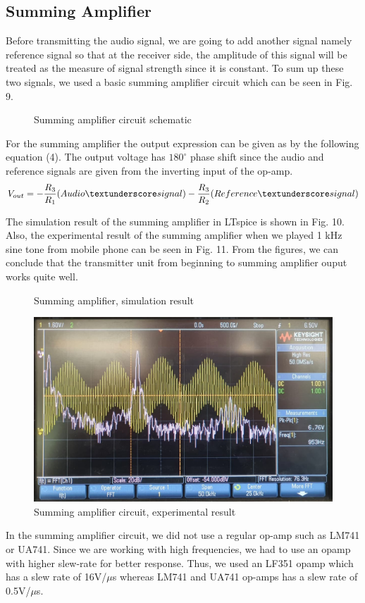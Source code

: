 \documentclass[conference]{IEEEtran}
\begin{document}
\subsection{Summing Amplifier}
Before transmitting the audio signal, we are going to add another signal namely reference signal so that at the receiver side, the amplitude of this signal will be treated as the measure of signal strength since it is constant. To sum up these two signals, we used a basic summing amplifier circuit which can be seen in Fig. 9.
 \begin{figure}[H]
   \centerline{}
    \caption{Summing amplifier circuit schematic}
\end{figure} 
\par For the summing amplifier the output expression can be given as by the following equation (4). The output voltage has \(180^\circ\) phase shift since the audio and reference signals are given from the inverting input of the op-amp.  
\begin{equation}\label{eq:3}
         V_{out} = -\frac{R_3}{R_1} \mbox{(Audio\textunderscore signal)} - \frac{R_3}{R_2} \mbox{(Reference\textunderscore signal)}
 \end{equation}
 \par The simulation result of the summing amplifier in LTspice is shown in Fig. 10. Also, the experimental result of the summing amplifier when we played 1 kHz sine tone from mobile phone can be seen in Fig. 11. From the figures, we can conclude that the transmitter unit from beginning to summing amplifier ouput works 
 quite well.  
  \begin{figure}[H]
   \centerline{}
    \caption{Summing amplifier, simulation result}
\end{figure} 
 \begin{figure}[H]
   \centerline{\includegraphics[scale=0.13]{summing.png}}
    \caption{Summing amplifier circuit, experimental result}
\end{figure} 
 \par In the summing amplifier circuit, we did not use a regular op-amp such as LM741 or UA741. Since we are working with high frequencies, we had to use an opamp with higher slew-rate for better response. Thus, we used an LF351 \cite{LF351} opamp which has a slew rate of 16V/\(\mu\)s whereas LM741 \cite{LM741} and UA741 \cite{uA741} op-amps has a slew rate of 0.5V/\(\mu\)s.
\end{document}
